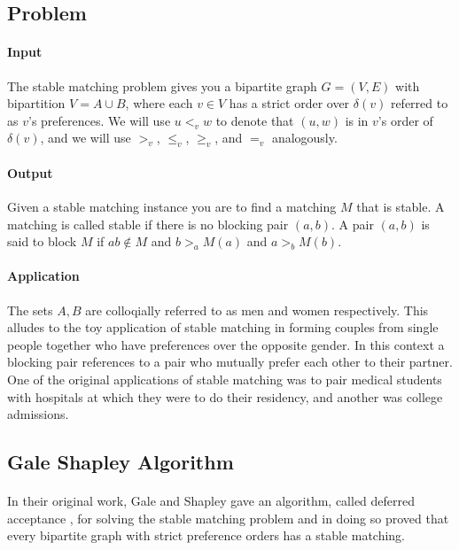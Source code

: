 \subsection{Problem}
\paragraph{Input}The stable matching problem gives you a bipartite graph $G=(V, E)$ with bipartition $V = A\cup B$, where each $v \in V$ has a strict order over $\delta(v)$ referred to as $v$'s preferences. We will use $u <_v w$ to denote that $(u,w)$ is in $v$'s order of $\delta(v)$, and we will use $>_v$, $\leq_v$, $\geq_v$, and $=_v$ analogously.
\paragraph{Output} Given a stable matching instance you are to find a matching $M$ that is stable. A matching is called stable if there is no blocking pair $(a,b)$. A pair $(a,b)$ is said to block $M$ if $ab \not\in M$ and $b >_a M(a)$ and $a >_b M(b)$.
\paragraph{Application} The sets $A,B$ are colloqially referred to as men and women respectively. This alludes to the toy application of stable matching in forming couples from single people together who have preferences over the opposite gender. In this context a blocking pair references to a pair who mutually prefer each other to their partner. One of the original applications of stable matching \cite{roth1984evolution} was to pair medical students with hospitals at which they were to do their residency, and another was college admissions.
\subsection{Gale Shapley Algorithm}
\paragraph{}
In their original work, Gale and Shapley gave an algorithm, called deferred acceptance \cite{gale1962college}, for solving the stable matching problem and in doing so proved that every bipartite graph with strict preference orders has a stable matching.
